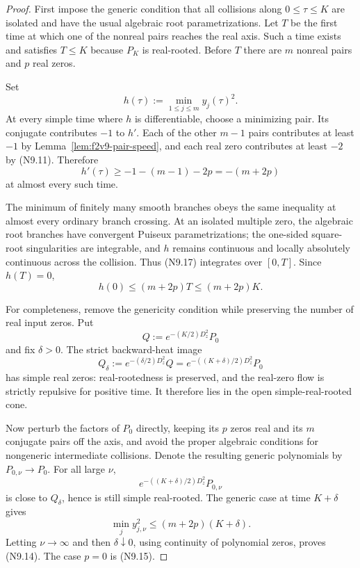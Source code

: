 \documentclass[11pt]{article}
\theoremstyle{definition}
\theoremstyle{remark}
\begin{document}
\begin{proof}
First impose the generic condition that all collisions along
\(0\le\tau\le K\) are isolated and have the usual algebraic root
parametrizations.  Let \(T\) be the first time at which one of the nonreal
pairs reaches the real axis.  Such a time exists and satisfies \(T\le K\)
because \(P_K\) is real-rooted.  Before \(T\) there are \(m\) nonreal pairs
and \(p\) real zeros.

Set
\[
 h(\tau):=\min_{1\le j\le m}y_j(\tau)^2.
 \tag{N9.16}
\]
At every simple time where \(h\) is differentiable, choose a minimizing
pair.  Its conjugate contributes \(-1\) to \(h'\).  Each of the other
\(m-1\) pairs contributes at least \(-1\) by
Lemma~\ref{lem:f2v9-pair-speed}, and each real zero contributes at least
\(-2\) by \textup{(N9.11)}.  Therefore
\[
 h'(\tau)\ge-1-(m-1)-2p=-(m+2p)
 \tag{N9.17}
\]
at almost every such time.

The minimum of finitely many smooth branches obeys the same inequality at
almost every ordinary branch crossing.  At an isolated multiple zero,
the algebraic root branches have convergent Puiseux parametrizations; the
one-sided square-root singularities are integrable, and \(h\) remains
continuous and locally absolutely continuous across the collision.
Thus \textup{(N9.17)} integrates over \([0,T]\).  Since \(h(T)=0\),
\[
 h(0)\le(m+2p)T\le(m+2p)K.
 \tag{N9.18}
\]

For completeness, remove the genericity condition while preserving the
number of real input zeros.  Put
\[
 Q:=e^{-(K/2)D_z^2}P_0
\]
and fix \(\delta>0\).  The strict backward-heat image
\[
 Q_\delta:=e^{-(\delta/2)D_z^2}Q
 =e^{-((K+\delta)/2)D_z^2}P_0
 \tag{N9.19}
\]
has simple real zeros: real-rootedness is preserved, and the real-zero
flow is strictly repulsive for positive time.  It therefore lies in the
open simple-real-rooted cone.

Now perturb the factors of \(P_0\) directly, keeping its \(p\) zeros real
and its \(m\) conjugate pairs off the axis, and avoid the proper algebraic
conditions for nongeneric intermediate collisions.  Denote the resulting
generic polynomials by \(P_{0,\nu}\to P_0\).  For all large \(\nu\),
\[
 e^{-((K+\delta)/2)D_z^2}P_{0,\nu}
\]
is close to \(Q_\delta\), hence is still simple real-rooted.  The generic
case at time \(K+\delta\) gives
\[
 \min_j y_{j,\nu}^2\le(m+2p)(K+\delta).
\]
Letting \(\nu\to\infty\) and then \(\delta\downarrow0\), using continuity
of polynomial zeros, proves \textup{(N9.14)}.  The case \(p=0\) is
\textup{(N9.15)}.
\end{proof}
\end{document}
